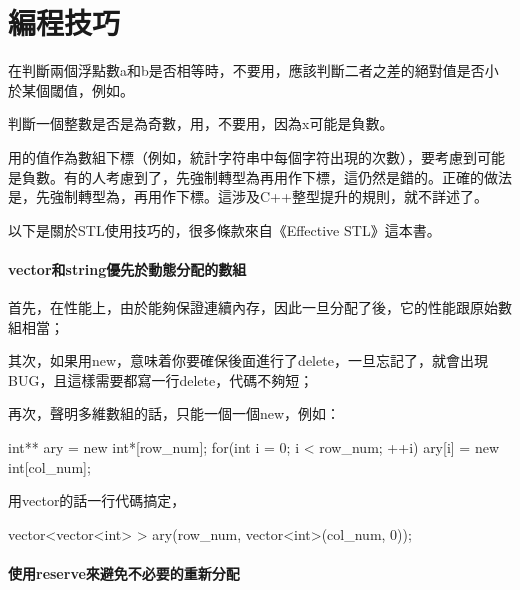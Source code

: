 \chapter{編程技巧}

在判斷兩個浮點數a和b是否相等時，不要用，應該判斷二者之差的絕對值是否小於某個閾值，例如。

判斷一個整數是否是為奇數，用，不要用，因為x可能是負數。

用的值作為數組下標（例如，統計字符串中每個字符出現的次數），要考慮到可能是負數。有的人考慮到了，先強制轉型為再用作下標，這仍然是錯的。正確的做法是，先強制轉型為，再用作下標。這涉及C++整型提升的規則，就不詳述了。

以下是關於STL使用技巧的，很多條款來自《Effective STL》這本書。

\subsubsection{vector和string優先於動態分配的數組}

首先，在性能上，由於能夠保證連續內存，因此一旦分配了後，它的性能跟原始數組相當；

其次，如果用new，意味着你要確保後面進行了delete，一旦忘記了，就會出現BUG，且這樣需要都寫一行delete，代碼不夠短；

再次，聲明多維數組的話，只能一個一個new，例如：
\begin{Code}
int** ary = new int*[row_num];
for(int i = 0; i < row_num; ++i)
    ary[i] = new int[col_num];
\end{Code}
用vector的話一行代碼搞定，
\begin{Code}
vector<vector<int> > ary(row_num, vector<int>(col_num, 0));
\end{Code}

\subsubsection{使用reserve來避免不必要的重新分配}
